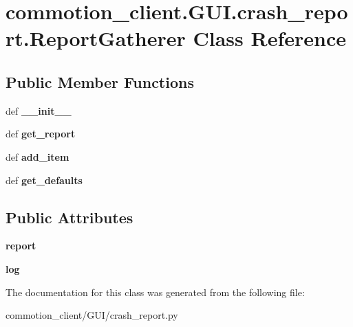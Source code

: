 \hypertarget{classcommotion__client_1_1GUI_1_1crash__report_1_1ReportGatherer}{\section{commotion\-\_\-client.\-G\-U\-I.\-crash\-\_\-report.\-Report\-Gatherer Class Reference}
\label{classcommotion__client_1_1GUI_1_1crash__report_1_1ReportGatherer}
}
\subsection*{Public Member Functions}
\begin{DoxyCompactItemize}
\item 
\hypertarget{classcommotion__client_1_1GUI_1_1crash__report_1_1ReportGatherer_a8f8a67b02e968b01536846640e15a329}{def {\bfseries \-\_\-\-\_\-init\-\_\-\-\_\-}}\label{classcommotion__client_1_1GUI_1_1crash__report_1_1ReportGatherer_a8f8a67b02e968b01536846640e15a329}

\item 
\hypertarget{classcommotion__client_1_1GUI_1_1crash__report_1_1ReportGatherer_a8832cfd560db654afe5305d15c525021}{def {\bfseries get\-\_\-report}}\label{classcommotion__client_1_1GUI_1_1crash__report_1_1ReportGatherer_a8832cfd560db654afe5305d15c525021}

\item 
\hypertarget{classcommotion__client_1_1GUI_1_1crash__report_1_1ReportGatherer_aaaccb80d5b2e14dc5c3eadd900fc1635}{def {\bfseries add\-\_\-item}}\label{classcommotion__client_1_1GUI_1_1crash__report_1_1ReportGatherer_aaaccb80d5b2e14dc5c3eadd900fc1635}

\item 
\hypertarget{classcommotion__client_1_1GUI_1_1crash__report_1_1ReportGatherer_a14752ca72ce630765b24c08cfd0ac685}{def {\bfseries get\-\_\-defaults}}\label{classcommotion__client_1_1GUI_1_1crash__report_1_1ReportGatherer_a14752ca72ce630765b24c08cfd0ac685}

\end{DoxyCompactItemize}
\subsection*{Public Attributes}
\begin{DoxyCompactItemize}
\item 
\hypertarget{classcommotion__client_1_1GUI_1_1crash__report_1_1ReportGatherer_ada108101968c0e64bc0280724ab26746}{{\bfseries report}}\label{classcommotion__client_1_1GUI_1_1crash__report_1_1ReportGatherer_ada108101968c0e64bc0280724ab26746}

\item 
\hypertarget{classcommotion__client_1_1GUI_1_1crash__report_1_1ReportGatherer_a67341c89d29bb1bebd477cdfac2e22f7}{{\bfseries log}}\label{classcommotion__client_1_1GUI_1_1crash__report_1_1ReportGatherer_a67341c89d29bb1bebd477cdfac2e22f7}

\end{DoxyCompactItemize}


The documentation for this class was generated from the following file\-:\begin{DoxyCompactItemize}
\item 
commotion\-\_\-client/\-G\-U\-I/crash\-\_\-report.\-py\end{DoxyCompactItemize}
